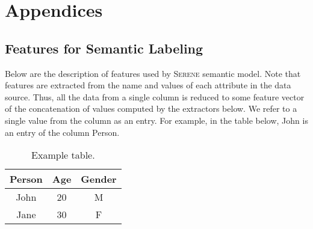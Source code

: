 \documentclass[letterpaper]{article} %
\newcommand{\serene}{\textsc{Serene}}
\begin{document}
\newpage
\section*{Appendices}
\renewcommand{\thesubsection}{\Alph{subsection}}

\subsection{Features for Semantic Labeling\label{Ann:SemLab}}

Below are the description of features used by \serene{} semantic model.
Note that features are extracted from the name and values of each attribute in the data source.
Thus, all the data from a single column is reduced to some feature
vector of the concatenation of values computed by the extractors below.
We refer to a single value from the column as an entry. For example, in the table below, John is an entry of the column Person.

\begin{table}[!ht]\small
  \centering
  \caption{Example table.}
  	\begin{tabular}{ccc} 
  		\hline
		Person & Age & Gender \\
  		\hline
	    John & 20 & M\\
    	Jane & 30 & F\\
  		\hline
		\end{tabular} 
\end{table}
\end{document}
